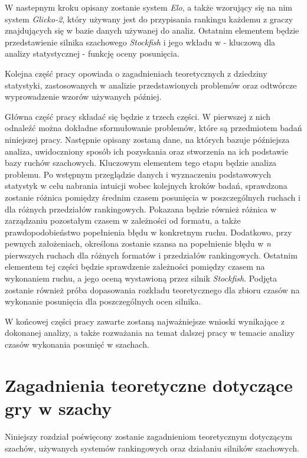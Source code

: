 \documentclass[inzynierska]{pwr_wmat_praca_dyplomowa}
\theoremstyle{plain}
\numberwithin{theorem}{chapter}
\theoremstyle{definition}
\numberwithin{theorem}{chapter}
\begin{document}
W nastepnym kroku opisany zostanie system \textit{Elo}, a także wzorujący się na nim system \textit{Glicko-2}, który używany jest do przypisania rankingu każdemu z graczy znajdujących się w bazie danych używanej do analiz. Ostatnim elementem będzie przedstawienie  silnika szachowego \textit{Stockfish} i jego wkładu w - kluczową dla analizy statystycznej - funkcję oceny posunięcia.


Kolejna część pracy opowiada o zagadnieniach teoretycznych z dziedziny statystyki, zastosowanych w analizie przedstawionych problemów oraz odtwórcze wyprowadzenie wzorów używanych później.
 
 
Główna część pracy składać się będzie z trzech części. W pierwszej z nich odnaleźć można dokładne sformułowanie problemów, które są przedmiotem badań niniejszej pracy. Następnie opisany zostaną dane, na których bazuje późniejsza analiza,  uwidoczniony sposób ich pozyskania oraz stworzenia na ich podstawie bazy ruchów szachowych. Kluczowym elementem tego etapu będzie analiza problemu. Po wstępnym przeglądzie danych i wyznaczeniu podstawowych statystyk w celu nabrania intuicji wobec kolejnych kroków badań, sprawdzona zostanie różnica pomiędzy średnim czasem posunięcia w poszczególnych ruchach i dla różnych przedziałów rankingowych. Pokazana będzie również różnica w zarządzaniu pozostałym czasem w zależności od formatu, a także prawdopodobieństwo popełnienia błędu w konkretnym ruchu. Dodatkowo, przy pewnych założeniach, określona zostanie szansa na popełnienie błędu w \textit{n} pierwszych ruchach dla różnych formatów i przedziałów rankingowych. Ostatnim elementem tej części będzie sprawdzenie zależności pomiędzy czasem na wykonaniem ruchu, a jego oceną wystawioną przez silnik \textit{Stockfish}. Podjęta zostanie również próba dopasowania rozkładu teoretycznego dla zbioru czasów na wykonanie posunięcia dla poszczególnych ocen silnika.


W końcowej części pracy zawarte zostaną najważniejsze wnioski wynikające z dokonanej analizy, a także rozważania na temat dalszej pracy w temacie analizy czasów wykonania posunięć w szachach.

\chapter{Zagadnienia teoretyczne dotyczące gry w szachy}
Niniejszy rozdział poświęcony zostanie zagadnieniom teoretycznym dotyczącym szachów, używanych systemów rankingowych oraz działaniu silników szachowych.
\end{document}
